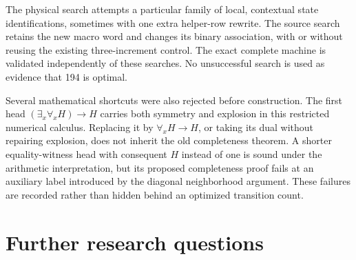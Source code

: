\documentclass[11pt,letterpaper]{article}
\begin{document}
The physical search attempts a particular family of local, contextual
state identifications, sometimes with one extra helper-row rewrite.
The source search retains the new macro word and changes its binary
association, with or without reusing the existing three-increment control.
The exact complete machine is validated independently of these searches.
No unsuccessful search is used as evidence that 194 is optimal.

Several mathematical shortcuts were also rejected before construction.
The first head $(\exists_x\forall_x H)\to H$ carries both symmetry and
explosion in this restricted numerical calculus. Replacing it by
$\forall_xH\to H$, or taking its dual without repairing explosion, does
not inherit the old completeness theorem. A shorter equality-witness
head with consequent $H$ instead of one is sound under the arithmetic
interpretation, but its proposed completeness proof fails at an auxiliary
label introduced by the diagonal neighborhood argument. These failures
are recorded rather than hidden behind an optimized transition count.



\section{Further research questions}
\end{document}
